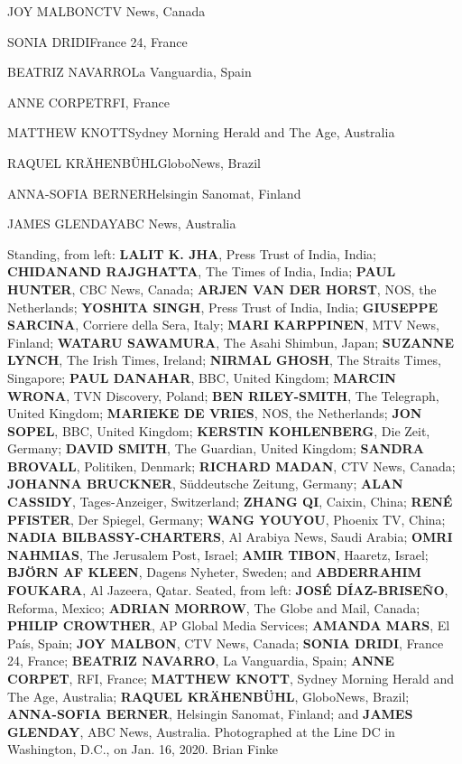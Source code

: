JOY MALBONCTV News, Canada

SONIA DRIDIFrance 24, France

BEATRIZ NAVARROLa Vanguardia, Spain

ANNE CORPETRFI, France

MATTHEW KNOTTSydney Morning Herald and The Age, Australia

RAQUEL KRÄHENBÜHLGloboNews, Brazil

ANNA-SOFIA BERNERHelsingin Sanomat, Finland

JAMES GLENDAYABC News, Australia

Standing, from left: \textbf{LALIT K. JHA}, Press Trust of India, India;
\textbf{CHIDANAND RAJGHATTA}, The Times of India, India; \textbf{PAUL
HUNTER}, CBC News, Canada; \textbf{ARJEN VAN DER HORST}, NOS, the
Netherlands; \textbf{YOSHITA SINGH}, Press Trust of India, India;
\textbf{GIUSEPPE SARCINA}, Corriere della Sera, Italy; \textbf{MARI
KARPPINEN}, MTV News, Finland; \textbf{WATARU SAWAMURA}, The Asahi
Shimbun, Japan; \textbf{SUZANNE LYNCH}, The Irish Times, Ireland;
\textbf{NIRMAL GHOSH}, The Straits Times, Singapore; \textbf{PAUL
DANAHAR}, BBC, United Kingdom; \textbf{MARCIN WRONA}, TVN Discovery,
Poland; \textbf{BEN RILEY-SMITH}, The Telegraph, United Kingdom;
\textbf{MARIEKE DE VRIES}, NOS, the Netherlands; \textbf{JON SOPEL},
BBC, United Kingdom; \textbf{KERSTIN KOHLENBERG}, Die Zeit, Germany;
\textbf{DAVID SMITH}, The Guardian, United Kingdom; \textbf{SANDRA
BROVALL}, Politiken, Denmark; \textbf{RICHARD MADAN}, CTV News, Canada;
\textbf{JOHANNA BRUCKNER}, Süddeutsche Zeitung, Germany; \textbf{ALAN
CASSIDY}, Tages-Anzeiger, Switzerland; \textbf{ZHANG QI}, Caixin, China;
\textbf{RENÉ PFISTER}, Der Spiegel, Germany; \textbf{WANG YOUYOU},
Phoenix TV, China; \textbf{NADIA BILBASSY-CHARTERS}, Al Arabiya News,
Saudi Arabia; \textbf{OMRI NAHMIAS}, The Jerusalem Post, Israel;
\textbf{AMIR TIBON}, Haaretz, Israel; \textbf{BJÖRN AF KLEEN}, Dagens
Nyheter, Sweden; and \textbf{ABDERRAHIM FOUKARA}, Al Jazeera, Qatar.
Seated, from left: \textbf{JOSÉ DÍAZ-BRISEÑO}, Reforma, Mexico;
\textbf{ADRIAN MORROW}, The Globe and Mail, Canada; \textbf{PHILIP
CROWTHER}, AP Global Media Services; \textbf{AMANDA MARS}, El País,
Spain; \textbf{JOY MALBON}, CTV News, Canada; \textbf{SONIA DRIDI},
France 24, France; \textbf{BEATRIZ NAVARRO}, La Vanguardia, Spain;
\textbf{ANNE CORPET}, RFI, France; \textbf{MATTHEW KNOTT}, Sydney
Morning Herald and The Age, Australia; \textbf{RAQUEL KRÄHENBÜHL},
GloboNews, Brazil; \textbf{ANNA-SOFIA BERNER}, Helsingin Sanomat,
Finland; and \textbf{JAMES GLENDAY}, ABC News, Australia. Photographed
at the Line DC in Washington, D.C., on Jan. 16, 2020. Brian Finke


